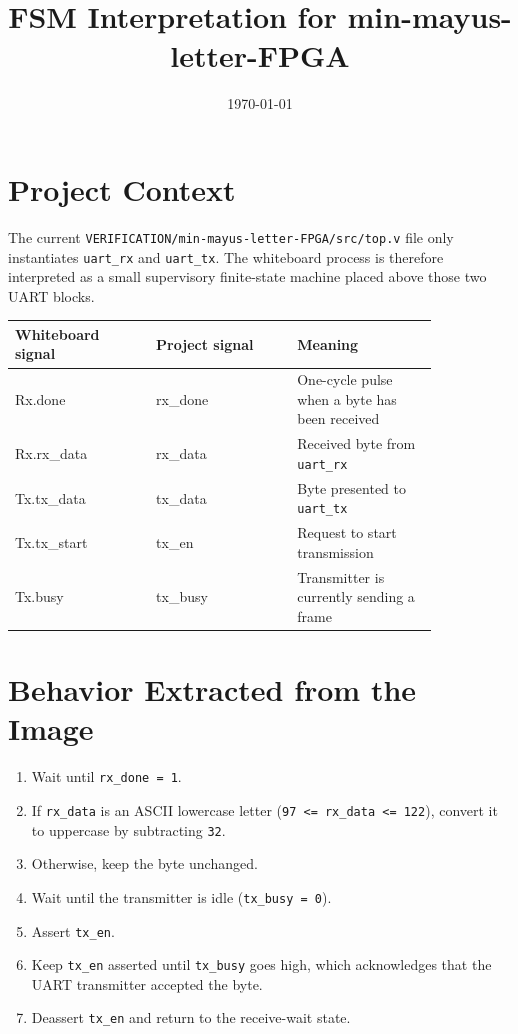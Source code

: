\documentclass[11pt]{article}
\title{FSM Interpretation for min-mayus-letter-FPGA}
\author{}
\date{\today}
\begin{document}
\maketitle

\section*{Project Context}

The current \texttt{VERIFICATION/min-mayus-letter-FPGA/src/top.v} file only
instantiates \texttt{uart\_rx} and \texttt{uart\_tx}. The whiteboard process is
therefore interpreted as a small supervisory finite-state machine placed above
those two UART blocks.

\begin{center}
\begin{tabular}{|>{\ttfamily}p{0.28\linewidth}|>{\ttfamily}p{0.28\linewidth}|p{0.28\linewidth}|}
\hline
Whiteboard signal & Project signal & Meaning \\
\hline
Rx.done & rx\_done & One-cycle pulse when a byte has been received \\
\hline
Rx.rx\_data & rx\_data & Received byte from \texttt{uart\_rx} \\
\hline
Tx.tx\_data & tx\_data & Byte presented to \texttt{uart\_tx} \\
\hline
Tx.tx\_start & tx\_en & Request to start transmission \\
\hline
Tx.busy & tx\_busy & Transmitter is currently sending a frame \\
\hline
\end{tabular}
\end{center}

\section*{Behavior Extracted from the Image}

\begin{enumerate}
    \item Wait until \texttt{rx\_done = 1}.
    \item If \texttt{rx\_data} is an ASCII lowercase letter
    (\texttt{97 <= rx\_data <= 122}), convert it to uppercase by subtracting
    \texttt{32}.
    \item Otherwise, keep the byte unchanged.
    \item Wait until the transmitter is idle (\texttt{tx\_busy = 0}).
    \item Assert \texttt{tx\_en}.
    \item Keep \texttt{tx\_en} asserted until \texttt{tx\_busy} goes high,
    which acknowledges that the UART transmitter accepted the byte.
    \item Deassert \texttt{tx\_en} and return to the receive-wait state.
\end{enumerate}
\end{document}
